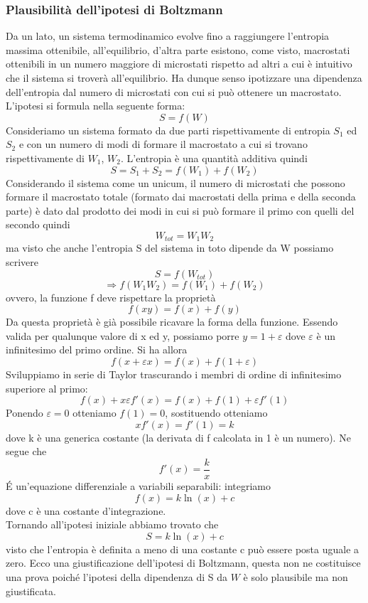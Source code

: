 \documentclass[
10pt, %
a4paper, %
oneside, %
headinclude,footinclude, %
BCOR5mm, %
]{scrartcl}
\begin{document}
\subsubsection*{Plausibilità dell'ipotesi di Boltzmann}
Da un lato, un sistema termodinamico evolve fino a raggiungere l'entropia massima ottenibile, all'equilibrio, d'altra parte esistono, come visto, macrostati ottenibili in un numero maggiore di microstati rispetto ad altri a cui è intuitivo che il sistema si troverà all'equilibrio. Ha dunque senso ipotizzare una dipendenza dell'entropia dal numero di microstati con cui si può ottenere un macrostato. L'ipotesi si formula nella seguente forma:
\[S = f(W)\]
Consideriamo un sistema formato da due parti rispettivamente di entropia \(S_1\) ed \(S_2\) e con un numero di modi di formare il macrostato a cui si trovano rispettivamente di \(W_1\), \(W_2\). L'entropia è una quantità additiva quindi
\[S=S_1+S_2 = f(W_1)+f(W_2)\]
Considerando il sistema come un unicum, il numero di microstati che possono formare il macrostato totale (formato dai macrostati della prima e della seconda parte) è dato dal prodotto dei modi in cui si può formare il primo con quelli del secondo quindi
\[W_{tot}=W_1W_2\]
ma visto che anche l'entropia S del sistema in toto dipende da W possiamo scrivere
\[S=f(W_{tot})\]
\[\Rightarrow f(W_1W_2) = f(W_1)+f(W_2)\]
ovvero, la funzione f deve rispettare la proprietà
\[f(xy)=f(x)+f(y)\]
Da questa proprietà è già possibile ricavare la forma della funzione. Essendo valida per qualunque valore di x ed y, possiamo porre \(y=1+\varepsilon\) dove $\varepsilon$ è un infinitesimo del primo ordine. Si ha allora
\[f(x+\varepsilon x) = f(x)+f(1+\varepsilon)\]
Sviluppiamo in serie di Taylor trascurando i membri di ordine di infinitesimo superiore al primo:
\[f(x)+x\varepsilon f'(x)=f(x)+f(1)+\varepsilon f'(1)\]
Ponendo \(\varepsilon = 0\) otteniamo \(f(1)=0\), sostituendo otteniamo 
\[x f'(x) = f'(1)=k\]
dove k è una generica costante (la derivata di f calcolata in 1 è un numero). Ne segue che 
\[f'(x)=\frac{k}{x}\]
\'{E} un'equazione differenziale a variabili separabili: integriamo
\[f(x)=k\ln(x)+c\]
dove c è una costante d'integrazione.\\
Tornando all'ipotesi iniziale abbiamo trovato che 
\[S =k\ln(x)+c\]
visto che l'entropia è definita a meno di una costante c può essere posta uguale a zero. Ecco una giustificazione dell'ipotesi di Boltzmann, questa non ne costituisce una prova poiché l'ipotesi della dipendenza di S da \(W\) è solo plausibile ma non giustificata.\\\\
\end{document}
